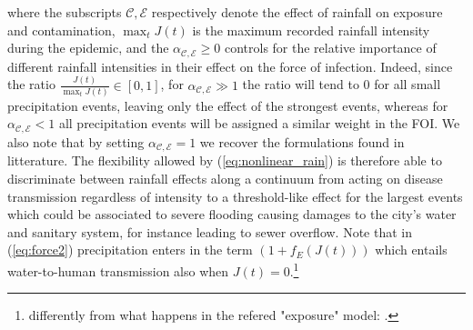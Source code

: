 where the subscripts $\mathcal{C,E}$ respectively denote the effect of rainfall on exposure and contamination, $\max_t J(t)$ is the maximum recorded rainfall intensity during the epidemic, and the $\alpha_{\mathcal{C,E}}\ge0$ controls for the relative importance of different rainfall intensities in their effect on the force of infection. Indeed, since the ratio $\frac{J(t)}{\max_t J(t)} \in [0,1]$, for $\alpha_{\mathcal{C,E}} \gg 1$ the ratio will tend to 0 for all small precipitation events, leaving only the effect of the strongest events, whereas for $\alpha_{\mathcal{C,E}} < 1$ all precipitation events will be assigned a similar weight in the FOI. We also note that by setting $\alpha_{\mathcal{C,E}} = 1$ we recover the formulations found in litterature. The flexibility allowed by (\ref{eq:nonlinear_rain}) is therefore able to discriminate between rainfall effects along a continuum from acting on disease transmission regardless of intensity to a threshold-like effect for the largest events which could be associated to severe flooding causing damages to the city's water and sanitary system, for instance leading to sewer overflow.
Note that in (\ref{eq:force2}) precipitation enters in the term $\left(1+f_E \left(J(t)\right)\right)$ which entails water-to-human transmission also when $J(t)=0$.\footnote{differently from what happens in the refered "exposure" model: .} 

